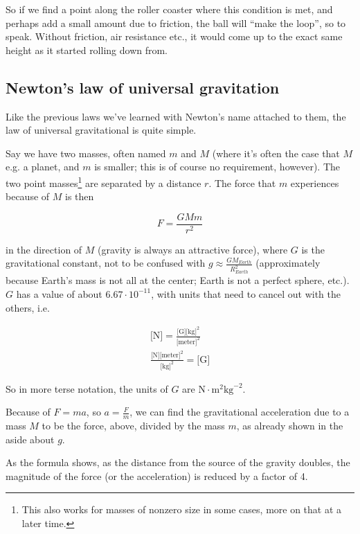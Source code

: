 So if we find a point along the roller coaster where this condition is met, and perhaps add a small amount due to friction, the ball will ``make the loop'', so to speak. Without friction, air resistance etc., it would come up to the exact same height as it started rolling down from.

\subsection{Newton's law of universal gravitation}

Like the previous laws we've learned with Newton's name attached to them, the law of universal gravitational is quite simple.

Say we have two masses, often named $m$ and $M$ (where it's often the case that $M$ e.g. a planet, and $m$ is smaller; this is of course no requirement, however). The two point masses\footnote{This also works for masses of nonzero size in some cases, more on that at a later time.} are separated by a distance $r$. The force that $m$ experiences because of $M$ is then

\begin{equation}
F = \frac{G M m}{r^2}
\end{equation}

in the direction of $M$ (gravity is always an attractive force), where $G$ is the gravitational constant, not to be confused with $\displaystyle g \approx \frac{G M_{Earth}}{R_{Earth}^2}$ (approximately because Earth's mass is not all at the center; Earth is not a perfect sphere, etc.).\\
$G$ has a value of about $6.67 \cdot 10^{-11}$, with units that need to cancel out with the others, i.e.

\begin{align}
\text{[N]} = \frac{\text{[G]} \text{[kg]}^2}{\text{[meter]}^2}\\
\frac{\text{[N]} \text{[meter]}^2}{\text{[kg]}^2} = \text{[G]}
\end{align}

So in more terse notation, the units of $G$ are $\text{N} \cdot \text{m}^2 \text{kg}^{-2}$.

Because of $F = ma$, so $\displaystyle a = \frac{F}{m}$, we can find the gravitational acceleration due to a mass $M$ to be the force, above, divided by the mass $m$, as already shown in the aside about $g$.

As the formula shows, as the distance from the source of the gravity doubles, the magnitude of the force (or the acceleration) is reduced by a factor of 4.

